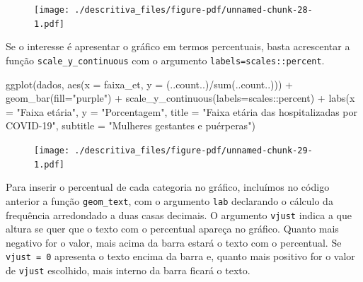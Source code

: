 \documentclass[
  letterpaper,
  DIV=11,
  numbers=noendperiod]{scrreprt}
\newenvironment{Shaded}{\begin{snugshade}}{\end{snugshade}}
\newcommand{\AttributeTok}[1]{\textcolor[rgb]{0.40,0.45,0.13}{#1}}
\newcommand{\FunctionTok}[1]{\textcolor[rgb]{0.28,0.35,0.67}{#1}}
\newcommand{\NormalTok}[1]{\textcolor[rgb]{0.00,0.23,0.31}{#1}}
\newcommand{\SpecialCharTok}[1]{\textcolor[rgb]{0.37,0.37,0.37}{#1}}
\newcommand{\StringTok}[1]{\textcolor[rgb]{0.13,0.47,0.30}{#1}}
\begin{document}
\begin{figure}[H]

{\centering \texttt{[image: ./descritiva\_files/figure-pdf/unnamed-chunk-28-1.pdf]}

}

\end{figure}

Se o interesse é apresentar o gráfico em termos percentuais, basta
acrescentar a função \texttt{scale\_y\_continuous} com o argumento
\texttt{labels=scales::percent}.

\begin{Shaded}
\begin{Highlighting}[]
\FunctionTok{ggplot}\NormalTok{(dados, }\FunctionTok{aes}\NormalTok{(}\AttributeTok{x =}\NormalTok{ faixa\_et, }\AttributeTok{y =}\NormalTok{ (..count..)}\SpecialCharTok{/}\FunctionTok{sum}\NormalTok{(..count..))) }\SpecialCharTok{+}  
  \FunctionTok{geom\_bar}\NormalTok{(}\AttributeTok{fill=}\StringTok{"purple"}\NormalTok{) }\SpecialCharTok{+} 
  \FunctionTok{scale\_y\_continuous}\NormalTok{(}\AttributeTok{labels=}\NormalTok{scales}\SpecialCharTok{::}\NormalTok{percent) }\SpecialCharTok{+}
  \FunctionTok{labs}\NormalTok{(}\AttributeTok{x =} \StringTok{"Faixa etária"}\NormalTok{, }\AttributeTok{y =} \StringTok{"Porcentagem"}\NormalTok{, }\AttributeTok{title =} \StringTok{"Faixa etária das hospitalizadas por COVID{-}19"}\NormalTok{, }\AttributeTok{subtitle =} \StringTok{"Mulheres gestantes e puérperas"}\NormalTok{)}
\end{Highlighting}
\end{Shaded}

\begin{figure}[H]

{\centering \texttt{[image: ./descritiva\_files/figure-pdf/unnamed-chunk-29-1.pdf]}

}

\end{figure}

Para inserir o percentual de cada categoria no gráfico, incluímos no
código anterior a função \texttt{geom\_text}, com o argumento
\texttt{lab} declarando o cálculo da frequência arredondado a duas casas
decimais. O argumento \texttt{vjust} indica a que altura se quer que o
texto com o percentual apareça no gráfico. Quanto mais negativo for o
valor, mais acima da barra estará o texto com o percentual. Se
\texttt{vjust\ =\ 0} apresenta o texto encima da barra e, quanto mais
positivo for o valor de \texttt{vjust} escolhido, mais interno da barra
ficará o texto.
\end{document}
